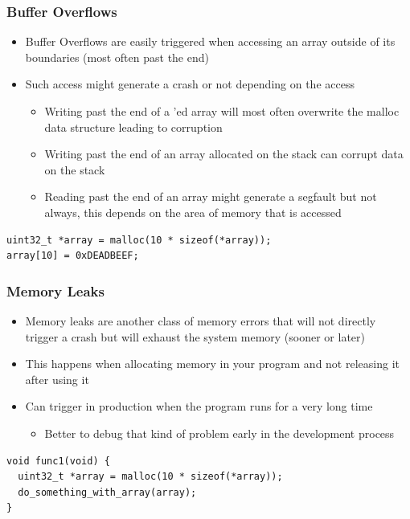 \begin{frame}[fragile]
  \frametitle{Buffer Overflows}
  \begin{itemize}
    \item Buffer Overflows are easily triggered when accessing an array outside
          of its boundaries (most often past the end)
    \item Such access might generate a crash or not depending on the access
    \begin{itemize}
      \item Writing past the end of a 'ed array will most often
            overwrite the malloc data structure leading to corruption
      \item Writing past the end of an array allocated on the stack can corrupt
            data on the stack
      \item Reading past the end of an array might generate a segfault but not
            always, this depends on the area of memory that is accessed
    \end{itemize}
  \end{itemize}
  \vspace{0.2cm}
  \begin{block}{}
    \begin{verbatim}
uint32_t *array = malloc(10 * sizeof(*array));
array[10] = 0xDEADBEEF;
    \end{verbatim}
  \end{block}
\end{frame}

\begin{frame}[fragile]
  \frametitle{Memory Leaks}
  \begin{itemize}
    \item Memory leaks are another class of memory errors that will not directly
          trigger a crash but will exhaust the system memory (sooner or later)
    \item This happens when allocating memory in your program and not releasing
          it after using it
    \item Can trigger in production when the program runs for a very long time
    \begin{itemize}
      \item Better to debug that kind of problem early in the development
            process
    \end{itemize}
  \end{itemize}
  \vspace{0.2cm}
  \begin{block}{}
    \begin{verbatim}
void func1(void) {
  uint32_t *array = malloc(10 * sizeof(*array));
  do_something_with_array(array);
}
    \end{verbatim}
  \end{block}
\end{frame}

